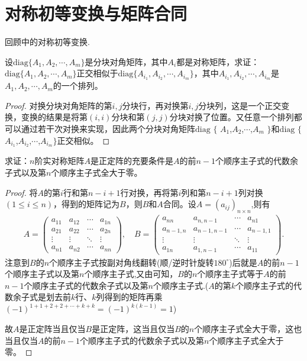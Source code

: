 \documentclass[../../main.tex]{subfiles}%
\begin{document}
\section{对称初等变换与矩阵合同}

回顾中的对称初等变换.

\begin{proposition}\label{proposition:分块对称准对角阵正交相似于其任意排列}
设\(\mathrm{diag}\{A_1,A_2,\cdots,A_m\}\)是分块对角矩阵，其中\(A_i\)都是对称矩阵，求证：\(\mathrm{diag}\{A_1,A_2,\cdots,A_m\}\)正交相似于\(\mathrm{diag}\{A_{i_1},A_{i_2},\cdots,A_{i_m}\}\)，其中\(A_{i_1},A_{i_2},\cdots,A_{i_m}\)是\(A_1,A_2,\cdots,A_m\)的一个排列。
\end{proposition}
\begin{proof}
对换分块对角矩阵的第\(i,j\)分块行，再对换第\(i,j\)分块列，这是一个正交变换，变换的结果是将第\((i,i)\)分块和第\((j,j)\)分块对换了位置。又任意一个排列都可以通过若干次对换来实现，因此两个分块对角矩阵$\mathrm{diag}$ $\{$ $A_1$,$A_2$,$\cdots$,$A_m$ $\}$和$\mathrm{diag}$ $\{$ $A_{i_1}$,$A_{i_2}$,$\cdots$,$A_{i_m}\}$正交相似。
\end{proof}

\begin{proposition}
求证：\(n\)阶实对称矩阵\(A\)是正定阵的充要条件是\(A\)的前\(n - 1\)个顺序主子式的代数余子式以及第\(n\)个顺序主子式全大于零。
\end{proposition}
\begin{proof}
将\(A\)的第\(i\)行和第\(n - i + 1\)行对换，再将第\(i\)列和第\(n - i + 1\)列对换\((1\leqslant  i\leqslant  n)\)，得到的矩阵记为\(B\)，则\(B\)和\(A\)合同。设$A=(a_{ij})_{n\times n}$,则有
\begin{align*}
A=
\begin{pmatrix}
a_{11} & a_{12} & \cdots & a_{1n} \\
a_{21} & a_{22} & \cdots & a_{2n} \\
\vdots & \vdots & \ddots & \vdots \\
a_{n1} & a_{n2} & \cdots & a_{nn}
\end{pmatrix},\quad
B=
\begin{pmatrix}
a_{nn} & a_{n,n-1} & \cdots & a_{n1} \\
a_{n-1,n} & a_{n-1,n-1} & \cdots & a_{n-1,1} \\
\vdots & \vdots & \ddots & \vdots \\
a_{1n} & a_{1,n-1} & \cdots & a_{11}
\end{pmatrix}.
\end{align*}
注意到\(B\)的\(n\)个顺序主子式按副对角线翻转(顺/逆时针旋转$180^{\circ}$)后就是\(A\)的前\(n - 1\)个顺序主子式以及第\(n\)个顺序主子式,又由可知，\(B\)的\(n\)个顺序主子式等于\(A\)的前\(n - 1\)个顺序主子式的代数余子式以及第\(n\)个顺序主子式.($A$的第$k$个顺序主子式的代数余子式是划去前$k$行、$k$列得到的矩阵再乘$(-1)^{1+1+2+2+\cdots+k+k}=(-1)^{k(k-1)}=1$)

故\(A\)是正定阵当且仅当\(B\)是正定阵，这当且仅当\(B\)的\(n\)个顺序主子式全大于零，这也当且仅当\(A\)的前\(n - 1\)个顺序主子式的代数余子式以及第\(n\)个顺序主子式全大于零。
\end{proof}
\end{document}
